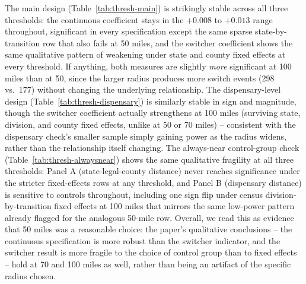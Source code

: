 \documentclass[preprint,12pt,authoryear]{elsarticle}
\begin{document}
The main design (Table~\ref{tab:thresh-main}) is strikingly stable
across all three thresholds: the continuous coefficient stays in the
$+0.008$ to $+0.013$ range throughout, significant in every
specification except the same sparse state-by-transition row that
also fails at 50 miles, and the switcher coefficient shows the same
qualitative pattern of weakening under state and county fixed effects
at every threshold. If anything, both measures are slightly
\emph{more} significant at 100 miles than at 50, since the larger
radius produces more switch events (298 vs.\ 177) without changing the
underlying relationship. The dispensary-level design
(Table~\ref{tab:thresh-dispensary}) is similarly stable in sign and
magnitude, though the switcher coefficient actually strengthens at 100
miles (surviving state, division, and county fixed effects, unlike at
50 or 70 miles) -- consistent with the dispensary check's smaller
sample simply gaining power as the radius widens, rather than the
relationship itself changing. The always-near control-group check
(Table~\ref{tab:thresh-alwaysnear}) shows the same qualitative fragility
at all three thresholds: Panel A (state-legal-county distance) never
reaches significance under the stricter fixed-effects rows at any
threshold, and Panel B (dispensary distance) is sensitive to controls
throughout, including one sign flip under census division-by-transition
fixed effects at 100 miles that mirrors the same low-power pattern
already flagged for the analogous 50-mile row. Overall, we read this as
evidence that 50 miles was a reasonable choice: the paper's qualitative
conclusions -- the continuous specification is more robust than the
switcher indicator, and the switcher result is more fragile to the
choice of control group than to fixed effects -- hold at 70 and 100
miles as well, rather than being an artifact of the specific radius
chosen.
\end{document}
